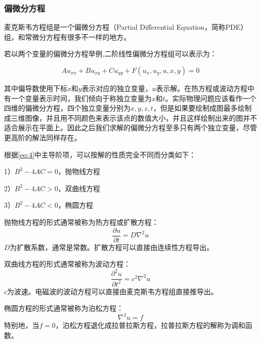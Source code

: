 \documentclass[UTF8,a4paper,10pt]{ctexart}
\begin{document}
\begin{multicols}{2}
            \subsubsection{偏微分方程}
            麦克斯韦方程组是一个偏微分方程（Partial Differential Equation，简称PDE）组，和常微分方程有很多不一样的地方。\par
            若以两个变量的偏微分方程举例,二阶线性偏微分方程组可以表示为：
            \begin{scriptsize}\label{eq:4}
                \begin{equation}
                    Au_{xx} + Bu_{xy} + Cu_{yy} + F(u_x,u_y,u,x,y) = 0
                \end{equation}
            \end{scriptsize}
            其中偏导数使用下标$x$和$y$表示对应的独立变量，$u$表示解。在热方程或波动方程中有一个变量表示时间，我们倾向于称独立变量为$x$和$t$。实际物理问题应该看作一个四维的偏微分方程，四个独立变量分别为$x,y,z,t$，但是如果要绘制成图最多绘制成三维图像，并且用不同颜色来表示该点的数值大小，并且这样绘制出来的图并不适合展示在平面上。因此之后我们求解的偏微分方程至多只有两个独立变量，尽管更高阶的解法同样存在。\par
            根据\eqref{eq:4}中主导阶项，可以按解的性质完全不同而分类如下：\par
            1）$B^2 - 4AC = 0$，抛物线方程\par
            2）$B^2 - 4AC > 0$，双曲线方程\par
            3）$B^2 - 4AC < 0$，椭圆方程\par
            抛物线方程的形式通常被称为热方程或扩散方程：
            \begin{equation}
                \frac{\partial u}{\partial t} = D\nabla^2 u
            \end{equation}
            $D$为扩散系数，通常是常数。扩散方程可以直接由连续性方程导出。\par
            双曲线方程的形式通常被称为波动方程：
            \begin{equation}
                \frac{\partial^2u}{\partial t^2} = c^2\nabla^2 u
            \end{equation}
            $c$为波速。电磁波的波动方程可以直接由麦克斯韦方程组直接推导出。\par
            椭圆方程的形式通常被称为泊松方程：
            \begin{equation}
                \nabla^2 u = f
            \end{equation}
            特别地，当$f=0$，泊松方程退化成拉普拉斯方程，拉普拉斯方程的解称为调和函数。\par

\end{multicols}
\end{document}
